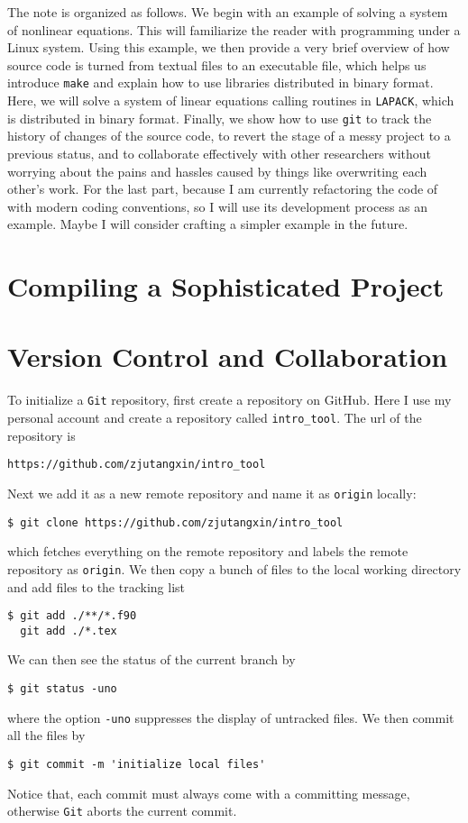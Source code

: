 \documentclass[twoside,12pt,leqno]{article}
\newcommand{\code}{\texttt}
\begin{document}
The note is organized as follows. We begin with an example of solving a system of nonlinear equations. This will familiarize the reader with programming under a Linux system. Using this example, we then provide a very brief overview of how source code is turned from textual files to an executable file, which helps us introduce \code{make} and explain how to use libraries distributed in binary format. Here, we will solve a system of linear equations calling routines in \code{LAPACK}, which is distributed in binary format. Finally, we show how to use \code{git} to track the history of changes of the source code, to revert the stage of a messy project to a previous status, and to collaborate effectively with other researchers without worrying about the pains and hassles caused by things like overwriting each other's work. For the last part, because I am currently refactoring the code of \citet{Azzimontietal:2014} with modern coding conventions, so I will use its development process as an example. Maybe I will consider crafting a simpler example in the future.

\section{Compiling a Sophisticated Project}


\section{Version Control and Collaboration}

To initialize a \code{Git} repository, first create a repository on GitHub. Here I use my personal account and create a repository called \code{intro\_tool}. The url of the repository is
{\color{blue}\begin{verbatim}
https://github.com/zjutangxin/intro_tool
\end{verbatim}}
\noindent Next we add it as a new remote repository and name it as \code{origin} locally:
\begin{verbatim}
$ git clone https://github.com/zjutangxin/intro_tool
\end{verbatim}
which fetches everything on the remote repository and labels the remote repository as \code{origin}. We then copy a bunch of files to the local working directory and add files to the tracking list
\begin{verbatim}
$ git add ./**/*.f90
  git add ./*.tex
\end{verbatim}
We can then see the status of the current branch by
\begin{verbatim}
$ git status -uno
\end{verbatim}
where the option \code{-uno} suppresses the display of untracked files. We then commit all the files by
\begin{verbatim}
$ git commit -m 'initialize local files'
\end{verbatim}
Notice that, each commit must always come with a committing message, otherwise \code{Git} aborts the current commit.
\end{document}
